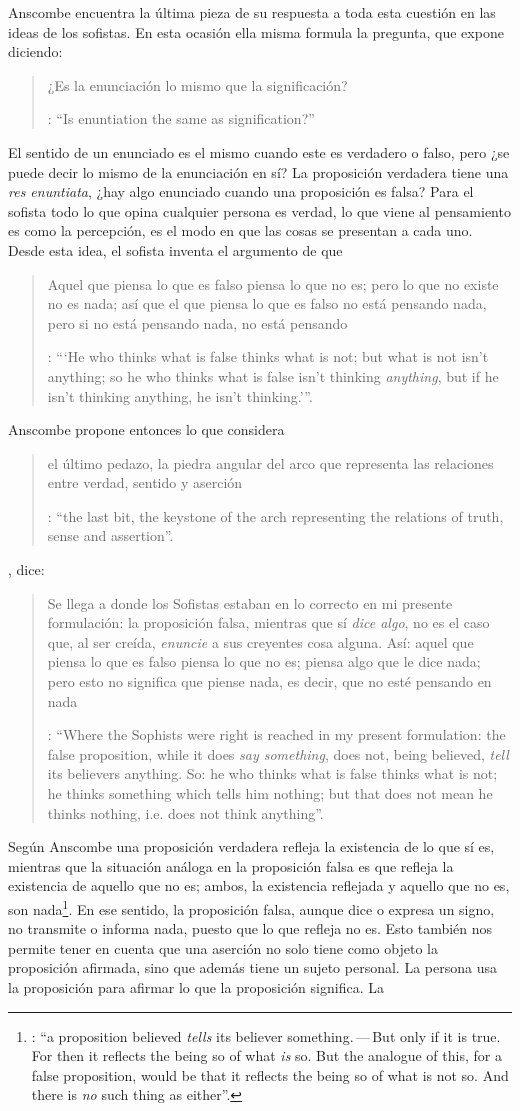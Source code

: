 Anscombe encuentra la última pieza de su respuesta a toda esta cuestión en las ideas de los sofistas. En esta ocasión ella misma formula la pregunta, que expone diciendo: \blockquote[{\Cite[271]{anscombe2015logic:tsa}}: \enquote{Is enuntiation the same as signification?}]{¿Es la enunciación lo mismo que la significación?}. El sentido de un enunciado es el mismo cuando este es verdadero o falso, pero ¿se puede decir lo mismo de la enunciación en sí? La proposición verdadera tiene una \emph{res enuntiata}, ¿hay algo enunciado cuando una proposición es falsa? Para el sofista todo lo que opina cualquier persona es verdad, lo que viene al pensamiento es como la percepción, es el modo en que las cosas se presentan a cada uno. Desde esta idea, el sofista inventa el argumento de que \blockquote[{\Cite[264]{anscombe2015logic:tsa}}: \enquote{`He who thinks what is false thinks what is not; but what is not isn't anything; so he who thinks what is false isn't thinking \emph{anything}, but if he isn't thinking anything, he isn't thinking.'}.]{Aquel que piensa lo que es falso piensa lo que no es; pero lo que no existe no es nada; así que el que piensa lo que es falso no está pensando nada, pero si no está pensando nada, no está pensando}. Anscombe propone entonces lo que considera \blockquote[{\Cite[271]{anscombe2015logic:tsa}}: \enquote{the last bit, the keystone of the arch representing the relations of truth, sense and assertion}.]{el último pedazo, la piedra angular del arco que representa las relaciones entre verdad, sentido y aserción}, dice: \blockquote[{\Cite[271]{anscombe2015logic:tsa}}: \enquote{Where the Sophists were right is reached in my present formulation: the false proposition, while it does \emph{say something}, does not, being believed, \emph{tell} its believers anything. So: he who thinks what is false thinks what is not; he thinks something which tells him nothing; but that does not mean he thinks nothing, i.e. does not think anything}.]{Se llega a donde los Sofistas estaban en lo correcto en mi presente formulación: la proposición falsa, mientras que sí \emph{dice algo}, no es el caso que, al ser creída, \emph{enuncie} a sus creyentes cosa alguna. Así: aquel que piensa lo que es falso piensa lo que no es; piensa algo que le dice nada; pero esto no significa que piense nada, es decir, que no esté pensando en nada}. Según Anscombe una proposición verdadera refleja la existencia de lo que sí es, mientras que la situación análoga en la proposición falsa es que refleja la existencia de aquello que no es; ambos, la existencia reflejada y aquello que no es, son nada\footnote{\cite[271]{anscombe2015logic:tsa}: \enquote{a proposition believed \emph{tells} its believer something.\,---\,But only if it is true. For then it reflects the being so of what \emph{is} so. But the analogue of this, for a false proposition, would be that it reflects the being so of what is not so. And there is \emph{no} such thing as either}.}. En ese sentido, la proposición falsa, aunque dice o expresa un signo, no transmite o informa nada, puesto que lo que refleja no es. Esto también nos permite tener en cuenta que una aserción no solo tiene como objeto la proposición afirmada, sino que además tiene un sujeto personal. La persona usa la proposición para afirmar lo que la proposición significa. La 